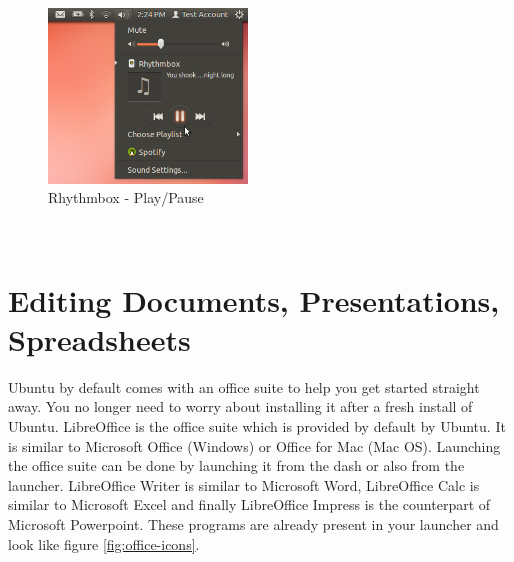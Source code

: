\begin{figure}[h!]	
	\centering
	\includegraphics[width=150pt]{./images/basic-tasks/play-music3.png}
	\caption{Rhythmbox - Play/Pause}	
	\label{fig:play-music3}		
\end{figure}

\par \noindent {} \\

\section{Editing Documents, Presentations, Spreadsheets} \label{sect:office}
Ubuntu by default comes with an office suite to help you get started straight away. You no longer need to worry about installing it after a fresh install of Ubuntu. LibreOffice is the office suite which is provided by default by Ubuntu. It is similar to Microsoft Office (Windows) or Office for Mac (Mac OS). Launching the office suite can be done by launching it from the dash or also from the launcher. LibreOffice Writer is similar to Microsoft Word, LibreOffice Calc is similar to Microsoft Excel and finally LibreOffice Impress is the counterpart of Microsoft Powerpoint. These programs are already present in your launcher and look like figure \ref{fig:office-icons}. \\

